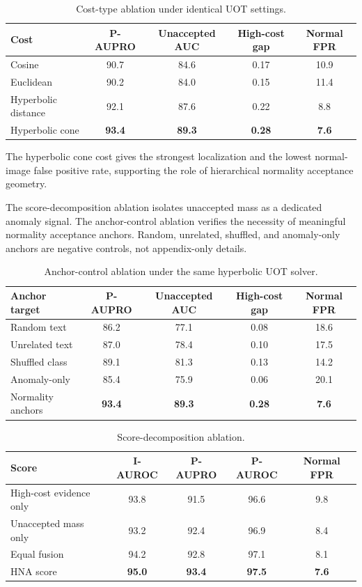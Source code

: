 \documentclass[10pt]{article}
\newcommand{\method}{HNA}
\begin{document}
\begin{table}[t]
\centering
\caption{Cost-type ablation under identical UOT settings.}
\label{tab:cost}
\begin{tabular}{lcccc}
\toprule
Cost & P-AUPRO & Unaccepted AUC & High-cost gap & Normal FPR \\
\midrule
Cosine & 90.7 & 84.6 & 0.17 & 10.9 \\
Euclidean & 90.2 & 84.0 & 0.15 & 11.4 \\
Hyperbolic distance & 92.1 & 87.6 & 0.22 & 8.8 \\
Hyperbolic cone & \textbf{93.4} & \textbf{89.3} & \textbf{0.28} & \textbf{7.6} \\
\bottomrule
\end{tabular}
\end{table}

The hyperbolic cone cost gives the strongest localization and the lowest normal-image false positive rate, supporting the role of hierarchical normality acceptance geometry.

The score-decomposition ablation isolates unaccepted mass as a dedicated anomaly signal.
The anchor-control ablation verifies the necessity of meaningful normality acceptance anchors.
Random, unrelated, shuffled, and anomaly-only anchors are negative controls, not appendix-only details.

\begin{table}[t]
\centering
\caption{Anchor-control ablation under the same hyperbolic UOT solver.}
\label{tab:anchor}
\begin{tabular}{lcccc}
\toprule
Anchor target & P-AUPRO & Unaccepted AUC & High-cost gap & Normal FPR \\
\midrule
Random text & 86.2 & 77.1 & 0.08 & 18.6 \\
Unrelated text & 87.0 & 78.4 & 0.10 & 17.5 \\
Shuffled class & 89.1 & 81.3 & 0.13 & 14.2 \\
Anomaly-only & 85.4 & 75.9 & 0.06 & 20.1 \\
Normality anchors & \textbf{93.4} & \textbf{89.3} & \textbf{0.28} & \textbf{7.6} \\
\bottomrule
\end{tabular}
\end{table}

\begin{table}[t]
\centering
\caption{Score-decomposition ablation.}
\label{tab:score}
\begin{tabular}{lcccc}
\toprule
Score & I-AUROC & P-AUPRO & P-AUROC & Normal FPR \\
\midrule
High-cost evidence only & 93.8 & 91.5 & 96.6 & 9.8 \\
Unaccepted mass only & 93.2 & 92.4 & 96.9 & 8.4 \\
Equal fusion & 94.2 & 92.8 & 97.1 & 8.1 \\
\method{} score & \textbf{95.0} & \textbf{93.4} & \textbf{97.5} & \textbf{7.6} \\
\bottomrule
\end{tabular}
\end{table}
\end{document}
